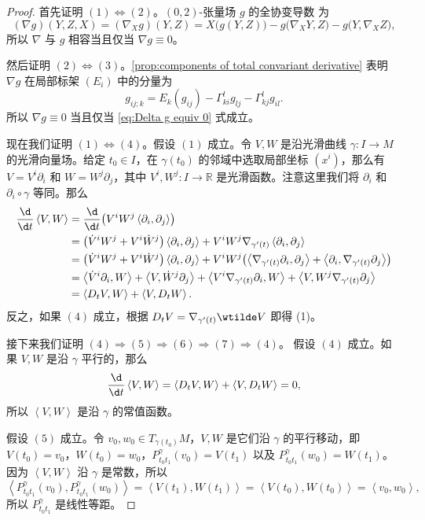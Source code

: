 \documentclass[fontset=none]{Notes}
\newcommand{\inn}[1]{\left\langle #1\right\rangle}
\begin{document}
\begin{proof}
  首先证明 $(1)\Leftrightarrow (2)$。$(0,2)$-张量场 $g$ 的全协变导数
  为
  \[
    (\nabla g)(Y,Z,X)=(\nabla_Xg)(Y,Z)  
    =X\bigl(g(Y,Z)\bigr)-g\bigl(\nabla_XY,Z\bigr)
    -g\bigl(Y,\nabla_XZ\bigr),
  \]
  所以 $\nabla$ 与 $g$ 相容当且仅当 $\nabla g\equiv 0$。

  然后证明 $(2)\Leftrightarrow (3)$。\autoref{prop:components of total convariant derivative}
  表明 $\nabla g$ 在局部标架 $(E_i)$ 中的分量为
  \[
    g_{ij;k}=E_k(g_{ij})-\Gamma_{ki}^lg_{lj}-\Gamma_{kj}^lg_{il}.  
  \]
  所以 $\nabla g\equiv 0$ 当且仅当 \eqref{eq:Delta g equiv 0} 式成立。

  现在我们证明 $(1)\Leftrightarrow (4)$。假设 $(1)$ 成立。令 $V,W$
  是沿光滑曲线 $\gamma:I\to M$ 的光滑向量场。给定 $t_0\in I$，在 $\gamma(t_0)$
  的邻域中选取局部坐标 $(x^i)$，那么有 $V=V^i\partial_i$ 和 $W=W^j\partial_j$，其中 $V^i,W^j:I\to \mathbb{R}$
  是光滑函数。注意这里我们将 $\partial_i$ 和 $\partial_i\circ\gamma$ 等同。那么
  \begin{align*}
    \frac{\d}{\d t}\inn{V,W}&=\frac{\d}{\d t}\bigl(V^iW^j\inn{\partial_i,\partial_j}\bigr)\\
    &=\bigl(\dot V^iW^j+V^i\dot W^j\bigr)\inn{\partial_i,\partial_j}+
    V^iW^j \nabla_{\gamma'(t)}\inn{\partial_i,\partial_j}\\
    &=\bigl(\dot V^iW^j+V^i\dot W^j\bigr)\inn{\partial_i,\partial_j}+V^iW^j
    \bigl(\inn{\nabla_{\gamma'(t)}\partial_i,\partial_j}+\inn{\partial_i,\nabla_{\gamma'(t)}\partial_j}\bigr)
    \\
    &=\inn{\dot V^i\partial_i,W}+\inn{V,\dot W^j\partial_j}+
    \inn{V^i\nabla_{\gamma'(t)}\partial_i,W}+\inn{V,W^j\nabla_{\gamma'(t)}\partial_j}\\
    &=\inn{D_tV,W}+\inn{V,D_tW}.
  \end{align*}
  反之，如果 $(4)$ 成立，根据 $D_tV=\nabla_{\gamma'(t)}\wtilde V$ 即得 (1)。

  接下来我们证明 $(4)\Rightarrow (5)\Rightarrow(6)\Rightarrow(7)\Rightarrow(4)$。
  假设 $(4)$ 成立。如果 $V,W$ 是沿 $\gamma$ 平行的，那么
  \[
    \frac{\d}{\d t}\inn{V,W}=\inn{D_tV,W}+\inn{V,D_tW}=0,
  \]
  所以 $\inn{V,W}$ 是沿 $\gamma$ 的常值函数。

  假设 $(5)$ 成立。令 $v_0,w_0\in T_{\gamma(t_0)}M$，$V,W$ 是它们沿
  $\gamma$ 的平行移动，即 $V(t_0)=v_0$，$W(t_0)=w_0$，$P_{t_0t_1}^\gamma(v_0)=V(t_1)$
  以及 $P_{t_0t_1}^\gamma(w_0)=W(t_1)$。因为 $\inn{V,W}$ 沿 $\gamma$ 是常数，所以
  \[
    \inn{P_{t_0t_1}^\gamma(v_0),P_{t_0t_1}^\gamma(w_0)}  
    =\inn{V(t_1),W(t_1)}=\inn{V(t_0),W(t_0)}=\inn{v_0,w_0},
  \]
  所以 $P_{t_0t_1}^\gamma$ 是线性等距。


\end{proof}
\end{document}
